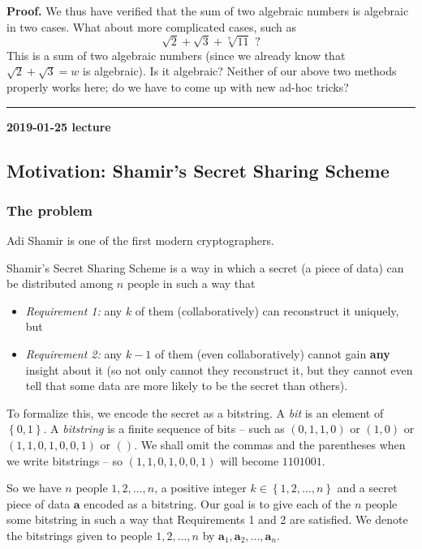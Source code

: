 \documentclass[numbers=enddot,12pt,final,onecolumn,notitlepage]{scrartcl}%
\numberwithin{exer}{section}
\theoremstyle{definition}
\newenvironment{proof}[1][Proof]{\noindent\textbf{#1.} }{\ \rule{0.5em}{0.5em}}
\begin{document}
\begin{proof}
We thus have verified that the sum of two algebraic numbers is algebraic in
two cases. What about more complicated cases, such as
\[
\sqrt{2}+\sqrt{3}+\sqrt[7]{11}\text{ ?}%
\]
This is a sum of two algebraic numbers (since we already know that $\sqrt
{2}+\sqrt{3}=w$ is algebraic). Is it algebraic? Neither of our above two
methods properly works here; do we have to come up with new ad-hoc tricks?
\end{proof}

\begin{center}
\textbf{2019-01-25 lecture}
\end{center}

\subsection{Motivation: Shamir's Secret Sharing Scheme}

\subsubsection{The problem}

Adi Shamir is one of the first modern cryptographers.

Shamir's Secret Sharing Scheme is a way in which a secret (a piece of data)
can be distributed among $n$ people in such a way that

\begin{itemize}
\item \textit{Requirement 1:} any $k$ of them (collaboratively) can
reconstruct it uniquely, but

\item \textit{Requirement 2:} any $k-1$ of them (even collaboratively) cannot
gain \textbf{any} insight about it (so not only cannot they reconstruct it,
but they cannot even tell that some data are more likely to be the secret than others).
\end{itemize}

To formalize this, we encode the secret as a bitstring. A \textit{bit} is an
element of $\left\{  0,1\right\}  $. A \textit{bitstring} is a finite sequence
of bits -- such as $\left(  0,1,1,0\right)  $ or $\left(  1,0\right)  $ or
$\left(  1,1,0,1,0,0,1\right)  $ or $\left(  {}\right)  $. We shall omit the
commas and the parentheses when we write bitstrings -- so $\left(
1,1,0,1,0,0,1\right)  $ will become $1101001$.

So we have $n$ people $1,2,\ldots,n$, a positive integer $k\in\left\{
1,2,\ldots,n\right\}  $ and a secret piece of data $\mathbf{a}$ encoded as a
bitstring. Our goal is to give each of the $n$ people some bitstring in such a
way that Requirements 1 and 2 are satisfied. We denote the bitstrings given to
people $1,2,\ldots,n$ by $\mathbf{a}_{1},\mathbf{a}_{2},\ldots,\mathbf{a}_{n}$.
\end{document}
